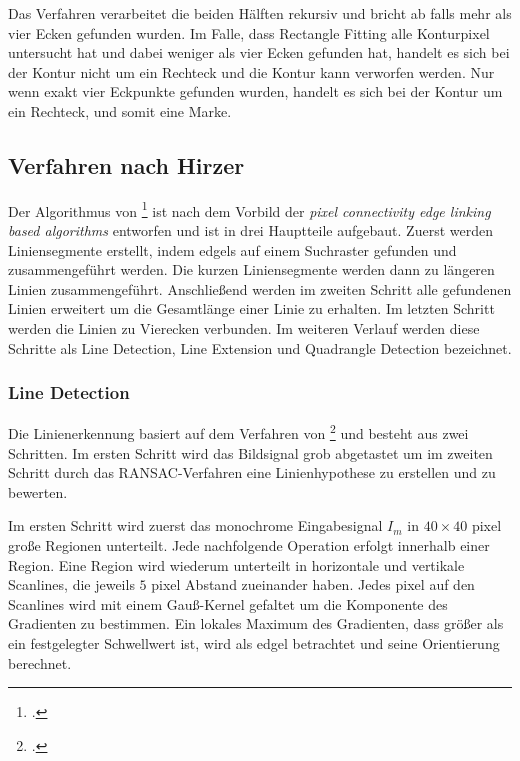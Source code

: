 Das Verfahren verarbeitet die beiden Hälften rekursiv und bricht ab falls mehr als vier Ecken gefunden wurden. Im Falle,
 dass Rectangle Fitting alle Konturpixel untersucht hat und dabei weniger als vier Ecken gefunden hat, handelt es sich
 bei der Kontur nicht um ein Rechteck und die Kontur kann verworfen werden. Nur wenn exakt vier Eckpunkte gefunden
 wurden, handelt es sich bei der Kontur um ein Rechteck, und somit eine Marke.



\subsection{Verfahren nach Hirzer} %
\label{sub:verfahren_nach_hirzer}

Der Algorithmus von \citeauthor{hirzer08}\footcite{hirzer08} ist nach dem Vorbild der \textit{pixel connectivity edge
 linking based algorithms} entworfen und ist in drei Hauptteile aufgebaut. Zuerst werden Liniensegmente erstellt,
 indem \glspl{edgel} auf einem Suchraster gefunden und zusammengeführt werden. Die kurzen Liniensegmente werden dann zu
 längeren Linien zusammengeführt. Anschließend werden im zweiten Schritt alle gefundenen Linien erweitert um die
 Gesamtlänge einer Linie zu erhalten. Im letzten Schritt werden die Linien zu Vierecken verbunden. Im weiteren Verlauf
 werden diese Schritte als Line Detection, Line Extension und Quadrangle Detection bezeichnet.

\subsubsection{Line Detection} %
\label{sub:line_detection}
Die Linienerkennung basiert auf dem Verfahren von \citeauthor{clarke96}\footcite{clarke96} und besteht aus zwei
 Schritten. Im ersten Schritt wird das Bildsignal grob abgetastet um im zweiten Schritt durch das RANSAC-Verfahren eine
 Linienhypothese zu erstellen und zu bewerten.

Im ersten Schritt wird zuerst das monochrome Eingabesignal $I_m$ in $40 \times 40$ \gls{pixel} große Regionen
 unterteilt. Jede nachfolgende Operation erfolgt innerhalb einer Region. Eine Region wird wiederum unterteilt in
 horizontale und vertikale Scanlines, die jeweils $5$ \gls{pixel} Abstand zueinander haben. Jedes \gls{pixel} auf den
 Scanlines wird mit einem Gauß-Kernel gefaltet um die Komponente des Gradienten zu bestimmen. Ein lokales Maximum des
 Gradienten, dass größer als ein festgelegter Schwellwert ist, wird als \gls{edgel} betrachtet und seine Orientierung
 berechnet.

